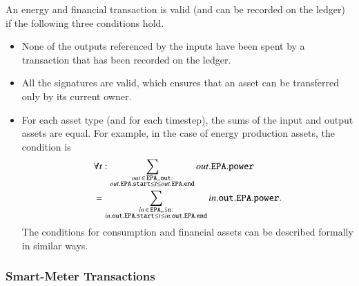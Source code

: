 An energy and financial transaction is valid (and can be recorded on
the ledger) if the following three conditions hold.
\begin{itemize}[noitemsep,topsep=-\parskip]
\item None of the outputs referenced by the inputs have been spent by
  a transaction that has been recorded on the ledger.
\item All the signatures are valid, which ensures that an asset can be
  transferred only by its current owner. 
\item For each asset type (and for each timestep), the sums of the
input and output assets are equal.  For example, in the case of
energy production assets, the condition is
\begin{align*}
& \forall t: \sum_{\substack{out \,\in\, \field{EPA\_out}:\\out.\field{EPA}.\field{start} \leq t \leq out.\field{EPA}.\field{end}}} out.\field{EPA}.\field{power} \nonumber \\
& = \sum_{\substack{in \,\in\, \field{EPA\_in}:\\in.\field{out}.\field{EPA}.\field{start} \leq t \leq in.\field{out}.\field{EPA}.\field{end}}} in.\field{out}.\field{EPA}.\field{power}  .
%
\end{align*}
The conditions for consumption and financial assets can be described
formally in similar ways.
\end{itemize}

\subsubsection{Smart-Meter Transactions}

